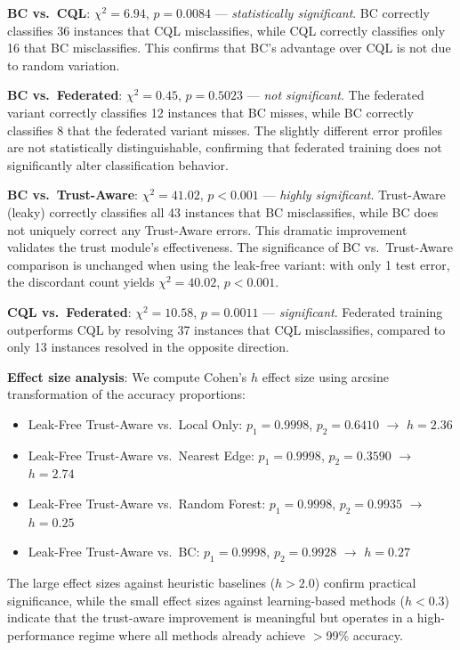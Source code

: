 \documentclass[journal,twoside]{IEEEtran}
\begin{document}
\textbf{BC vs.\ CQL}: $\chi^2 = 6.94$, $p = 0.0084$ --- \emph{statistically significant}. BC correctly classifies 36 instances that CQL misclassifies, while CQL correctly classifies only 16 that BC misclassifies. This confirms that BC's advantage over CQL is not due to random variation.

\textbf{BC vs.\ Federated}: $\chi^2 = 0.45$, $p = 0.5023$ --- \emph{not significant}. The federated variant correctly classifies 12 instances that BC misses, while BC correctly classifies 8 that the federated variant misses. The slightly different error profiles are not statistically distinguishable, confirming that federated training does not significantly alter classification behavior.

\textbf{BC vs.\ Trust-Aware}: $\chi^2 = 41.02$, $p < 0.001$ --- \emph{highly significant}. Trust-Aware (leaky) correctly classifies all 43 instances that BC misclassifies, while BC does not uniquely correct any Trust-Aware errors. This dramatic improvement validates the trust module's effectiveness. The significance of BC vs.\ Trust-Aware comparison is unchanged when using the leak-free variant: with only 1 test error, the discordant count yields $\chi^2 = 40.02$, $p < 0.001$.

\textbf{CQL vs.\ Federated}: $\chi^2 = 10.58$, $p = 0.0011$ --- \emph{significant}. Federated training outperforms CQL by resolving 37 instances that CQL misclassifies, compared to only 13 instances resolved in the opposite direction.

\textbf{Effect size analysis}: We compute Cohen's $h$ effect size using arcsine transformation of the accuracy proportions:
\begin{itemize}
    \item Leak-Free Trust-Aware vs.\ Local Only: $p_1=0.9998$, $p_2=0.6410$ $\rightarrow$ $h=2.36$
    \item Leak-Free Trust-Aware vs.\ Nearest Edge: $p_1=0.9998$, $p_2=0.3590$ $\rightarrow$ $h=2.74$
    \item Leak-Free Trust-Aware vs.\ Random Forest: $p_1=0.9998$, $p_2=0.9935$ $\rightarrow$ $h=0.25$
    \item Leak-Free Trust-Aware vs.\ BC: $p_1=0.9998$, $p_2=0.9928$ $\rightarrow$ $h=0.27$
\end{itemize}
The large effect sizes against heuristic baselines ($h > 2.0$) confirm practical significance, while the small effect sizes against learning-based methods ($h < 0.3$) indicate that the trust-aware improvement is meaningful but operates in a high-performance regime where all methods already achieve $>$99\% accuracy.
\end{document}
